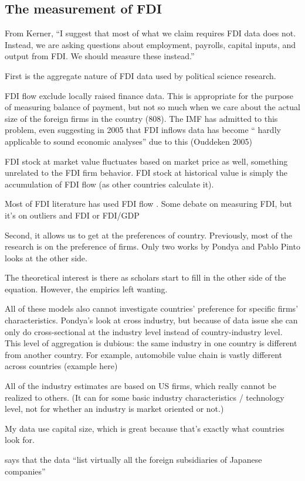 \subsection{The measurement of FDI}

From Kerner, ``I suggest that most of what we claim requires FDI data does not. Instead, we are asking questions about employment, payrolls, capital inputs, and output from FDI. We should measure these instead.''

First is the aggregate nature of FDI data used by political science research.

FDI flow exclude locally raised finance data. This is appropriate for the purpose of measuring balance of payment, but not so much when we care about the actual size of the foreign firms in the country (808). The IMF has admitted to this problem, even suggesting in 2005 that FDI 
inflows data has become “
hardly applicable to sound economic analyses” 
due to this
(Ouddeken 2005)


FDI stock at market value fluctuates based on market price as well, something unrelated to the FDI firm behavior. FDI stock at historical value is simply the accumulation of FDI flow (as other countries calculate it).

Most of FDI literature has used FDI flow \citep{Jensen2003, Ahlquist2006, Beazer2011, Graham2010}. Some debate on measuring FDI, but it's on outliers and FDI or FDI/GDP \citep{Li2009}

Second, it allows us to get at the preferences of country. Previously, most of the research is on the preference of firms. Only two works by Pondya and Pablo Pinto looks at the other side.

The theoretical interest is there as scholars start to fill in the other side of the equation. However, the empirics left wanting.

All of these models also cannot investigate countries' preference for specific firms' characteristics. Pondya's look at cross industry, but because of data issue she can only do cross-sectional at the industry level instead of country-industry level. This level of aggregation is dubious: the same industry in one country is different from another country. For example, automobile value chain is vastly different across countries (example here)

All of the industry estimates are based on US firms, which really cannot be realized to others. (It can for some basic industry characteristics / technology level, not for whether an industry is market oriented or not.)

My data use capital size, which is great because that's exactly what countries look for. 


\citep[295]{Yamawaki1991} says that the data ``list virtually all the foreign subsidiaries of Japanese companies''